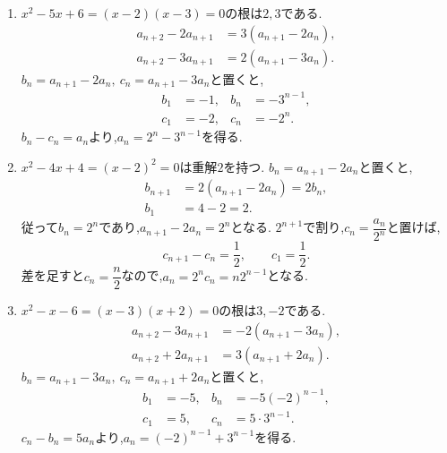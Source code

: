     \noindent{}\par\nobreak
    \begin{enumerate}[label=(\arabic*),parsep=3pt,format=\bookitemlink{example-three-term-1}{solution}{problem}]
      \item {}$x^2-5x+6=(x-2)(x-3)=0$の根は$2,3$である.
            \begin{align*}
              a_{n+2}-2a_{n+1}&=3(a_{n+1}-2a_n),\\
              a_{n+2}-3a_{n+1}&=2(a_{n+1}-3a_n).
            \end{align*}
            $b_n=a_{n+1}-2a_n,\ c_n=a_{n+1}-3a_n$と置くと,
            \[
              \begin{aligned}
                b_1&=-1,& b_n&=-3^{n-1},\\
                c_1&=-2,& c_n&=-2^n.
              \end{aligned}
            \]
            $b_n-c_n=a_n$より,$a_n=2^n-3^{n-1}$を得る.
      \item {}$x^2-4x+4=(x-2)^2=0$は重解$2$を持つ.
            $b_n=a_{n+1}-2a_n$と置くと,
            \[
              \begin{aligned}
                b_{n+1}&=2(a_{n+1}-2a_n)=2b_n,\\
                b_1&=4-2=2.
              \end{aligned}
            \]
            従って$b_n=2^n$であり,$a_{n+1}-2a_n=2^n$となる.
            $2^{n+1}$で割り,$c_n=\dfrac{a_n}{2^n}$と置けば,
            \[
              c_{n+1}-c_n=\frac12,\qquad c_1=\frac12.
            \]
            差を足すと$c_n=\dfrac{n}{2}$なので,$a_n=2^nc_n=n2^{n-1}$となる.
      \item {}$x^2-x-6=(x-3)(x+2)=0$の根は$3,-2$である.
            \begin{align*}
              a_{n+2}-3a_{n+1}&=-2(a_{n+1}-3a_n),\\
              a_{n+2}+2a_{n+1}&=3(a_{n+1}+2a_n).
            \end{align*}
            $b_n=a_{n+1}-3a_n,\ c_n=a_{n+1}+2a_n$と置くと,
            \[
              \begin{aligned}
                b_1&=-5,& b_n&=-5(-2)^{n-1},\\
                c_1&=5,& c_n&=5\cdot3^{n-1}.
              \end{aligned}
            \]
            $c_n-b_n=5a_n$より,$a_n=(-2)^{n-1}+3^{n-1}$を得る.
    \end{enumerate}

